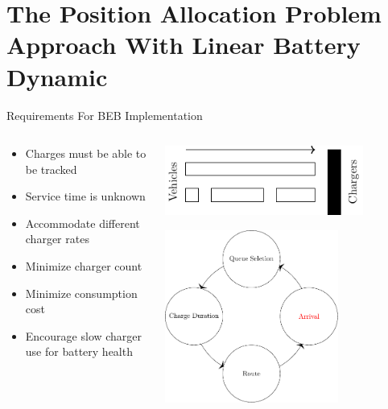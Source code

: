 \documentclass[aspectratio=169,dvipsnames]{beamer}
\begin{document}
\section{The Position Allocation Problem Approach With Linear Battery Dynamic}
\label{sec:orgbb9d924}
\begin{frame}[label={sec:orgcda9385}]{Requirements For BEB Implementation}
\begin{columns}
\begin{column}{0.5\columnwidth}
\begin{itemize}
\item Charges must be able to be tracked
\item Service time is unknown
\item Accommodate different charger rates
\item Minimize charger count
\item Minimize consumption cost
\item Encourage slow charger use for battery health
\end{itemize}
\end{column}

\begin{column}{0.5\columnwidth}
\begin{center}
\includegraphics[width=0.8\textwidth]{./img/pap.pdf}
\end{center}

\begin{center}
\includegraphics[width=0.7\textwidth]{./img/visit.pdf}
\end{center}
\end{column}
\end{columns}
\end{frame}
\end{document}
